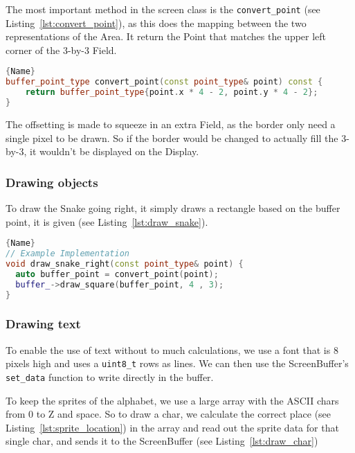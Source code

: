 The most important method in the screen class is the \texttt{convert\_point} (see Listing~\ref{lst:convert_point}), as this does the mapping between the two representations of the Area. It return the Point that matches the upper left corner of the 3-by-3 Field.

\begin{lstlisting}[caption={Converting an Area's point to a Display's point},label={lst:convert_point},frame=tlrb, language=C++]{Name}
buffer_point_type convert_point(const point_type& point) const {
    return buffer_point_type{point.x * 4 - 2, point.y * 4 - 2};
}
\end{lstlisting}

The offsetting is made to squeeze in an extra Field, as the border only need a single pixel to be drawn. So if the border would be changed to actually fill the 3-by-3, it wouldn't be displayed on the Display.

\subsubsection{Drawing objects}

To draw the Snake going right, it simply draws a rectangle based on the buffer point, it is given (see Listing~\ref{lst:draw_snake}).

\begin{lstlisting}[caption={Drawing a snake turning right},label={lst:draw_snake},frame=tlrb, language=C++]{Name}
// Example Implementation
void draw_snake_right(const point_type& point) {
  auto buffer_point = convert_point(point);
  buffer_->draw_square(buffer_point, 4 , 3);
}
\end{lstlisting}

\subsubsection{Drawing text}

To enable the use of text without to much calculations, we use a font that is 8 pixels high and uses a \texttt{uint8\_t} rows as lines. We can then use the ScreenBuffer's \texttt{set\_data} function to write directly in the buffer.

To keep the sprites of the alphabet, we use a large array with the ASCII chars from 0 to Z and space. So to draw a char, we calculate the correct place (see Listing~\ref{lst:sprite_location}) in the array and read out the sprite data for that single char, and sends it to the ScreenBuffer (see Listing~\ref{lst:draw_char})

